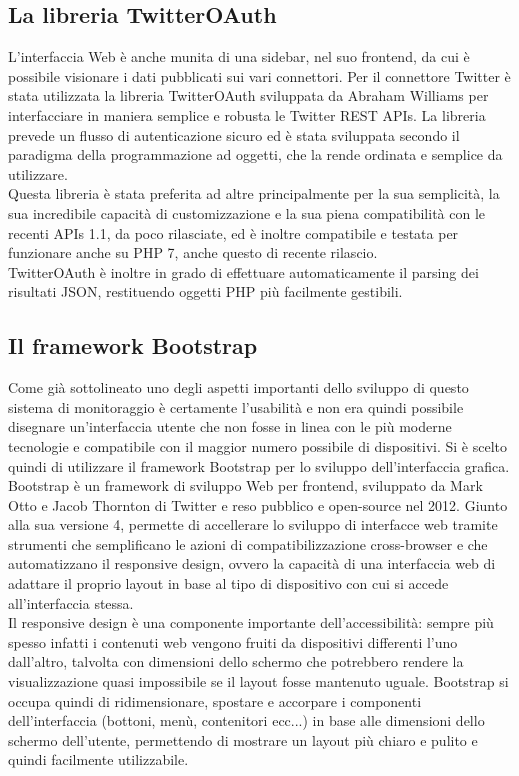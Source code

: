 \subsection{La libreria TwitterOAuth}
L'interfaccia Web è anche munita di una sidebar, nel suo frontend, da cui è possibile visionare i dati pubblicati sui vari connettori. Per il connettore Twitter è stata utilizzata la libreria TwitterOAuth sviluppata da Abraham Williams per interfacciare in maniera semplice e robusta le Twitter REST APIs. La libreria prevede un flusso di autenticazione sicuro ed è stata sviluppata secondo il paradigma della programmazione ad oggetti, che la rende ordinata e semplice da utilizzare.
\\Questa libreria è stata preferita ad altre principalmente per la sua semplicità, la sua incredibile capacità di customizzazione e la sua piena compatibilità con le recenti APIs 1.1, da poco rilasciate, ed è inoltre compatibile e testata per funzionare anche su PHP 7, anche questo di recente rilascio.
\\TwitterOAuth è inoltre in grado di effettuare automaticamente il parsing dei risultati JSON, restituendo oggetti PHP più facilmente gestibili.

\subsection{Il framework Bootstrap}
Come già sottolineato uno degli aspetti importanti dello sviluppo di questo sistema di monitoraggio è certamente l'usabilità e non era quindi possibile disegnare un'interfaccia utente che non fosse in linea con le più moderne tecnologie e compatibile con il maggior numero possibile di dispositivi. Si è scelto quindi di utilizzare il framework Bootstrap per lo sviluppo dell'interfaccia grafica. Bootstrap è un framework di sviluppo Web per frontend, sviluppato da Mark Otto e Jacob Thornton di Twitter e reso pubblico e open-source nel 2012. Giunto alla sua versione 4, permette di accellerare lo sviluppo di interfacce web tramite strumenti che semplificano le azioni di compatibilizzazione cross-browser e che automatizzano il responsive design, ovvero la capacità di una interfaccia web di adattare il proprio layout in base al tipo di dispositivo con cui si accede all'interfaccia stessa.
\\Il responsive design è una componente importante dell'accessibilità: sempre più spesso infatti i contenuti web vengono fruiti da dispositivi differenti l'uno dall'altro, talvolta con dimensioni dello schermo che potrebbero rendere la visualizzazione quasi impossibile se il layout fosse mantenuto uguale. Bootstrap si occupa quindi di ridimensionare, spostare e accorpare i componenti dell'interfaccia (bottoni, menù, contenitori ecc...) in base alle dimensioni dello schermo dell'utente, permettendo di mostrare un layout più chiaro e pulito e quindi facilmente utilizzabile.
